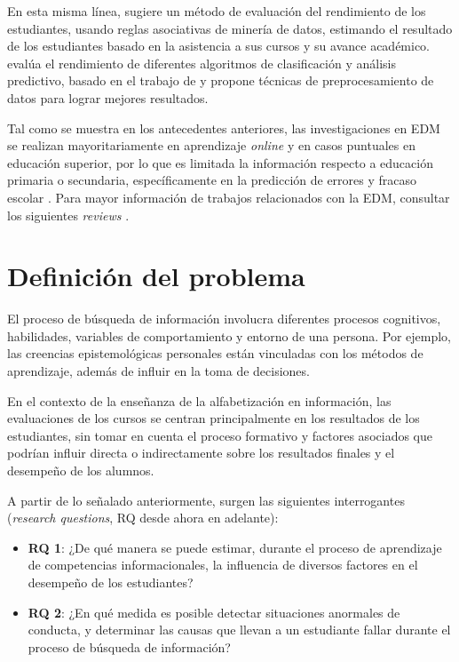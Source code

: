 En esta misma línea, \textcite{borkar2013predicting} sugiere un método de evaluación del rendimiento de los estudiantes, usando reglas asociativas de minería de datos, estimando el resultado de los estudiantes basado en la asistencia a sus cursos y su avance académico. \textcite{shazmeen2013performance} evalúa el rendimiento de diferentes algoritmos de clasificación y análisis predictivo, basado en el trabajo de \textcite{borkar2013predicting} y propone técnicas de preprocesamiento de datos para lograr mejores resultados. 

Tal como se muestra en los antecedentes anteriores, las investigaciones en EDM se realizan mayoritariamente en aprendizaje \textit{online} y en casos puntuales en educación superior, por lo que es limitada la información respecto a educación primaria o secundaria, específicamente en la predicción de errores y fracaso escolar \cite{marquez2013predicting}. Para mayor información de trabajos relacionados con la EDM, consultar los siguientes \textit{reviews} \cite{shahiri2015review,sukhija2015recent,anoopkumar2016review}. 

\section{Definición del problema}
\label{sec:definicion}
El proceso de búsqueda de información involucra diferentes procesos cognitivos, habilidades, variables de comportamiento y entorno de una persona. Por ejemplo, las creencias epistemológicas personales están vinculadas con los métodos de aprendizaje, además de influir en la toma de decisiones. 

En el contexto de la enseñanza de la alfabetización en información, las evaluaciones de los cursos se centran principalmente en los resultados de los estudiantes, sin tomar en cuenta el proceso formativo y factores asociados que podrían influir directa o indirectamente sobre los resultados finales y el desempeño de los alumnos.  

A partir de lo señalado anteriormente, surgen las siguientes interrogantes (\textit{research questions}, RQ desde ahora en adelante):

\begin{itemize}
	\item \textbf{RQ 1}: ¿De qué manera se puede estimar, durante el proceso de aprendizaje de competencias informacionales, la influencia de diversos factores en el desempeño de los estudiantes?
	\item \textbf{RQ 2}: ¿En qué medida es posible detectar situaciones anormales de conducta, y determinar las causas que llevan a un estudiante fallar durante el proceso de búsqueda de información? 
\end{itemize}
